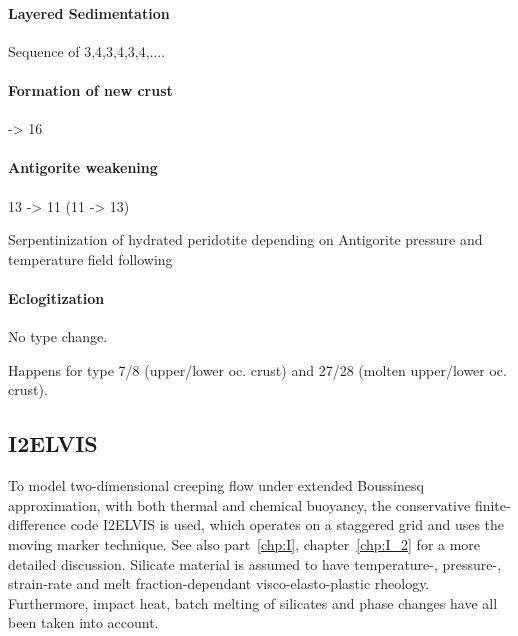 \paragraph{Layered Sedimentation}
Sequence of 3,4,3,4,3,4,....

\paragraph{Formation of new crust}
-> 16

\paragraph{Antigorite weakening}
13 -> 11 (11 -> 13)

Serpentinization of hydrated peridotite depending on Antigorite pressure and temperature field following \citep{Schmidt & Poli, 1998}

\paragraph{Eclogitization}
No type change.

Happens for type 7/8 (upper/lower oc. crust) and 27/28 (molten upper/lower oc. crust).

%


\subsection{I2ELVIS}

To model two-dimensional creeping flow under extended Boussinesq approximation, with both thermal and chemical buoyancy, the conservative finite-difference code I2ELVIS \citep{GeryaYuen2003,Gerya2007} is used, which operates on a staggered grid and uses the moving marker technique. See also part~\ref{chp:I}, chapter~\ref{chp:I_2} for a more detailed discussion. Silicate material is assumed to have temperature-, pressure-, strain-rate and melt fraction-dependant visco-elasto-plastic rheology. Furthermore, impact heat, batch melting of silicates and phase changes have all been taken into account.

